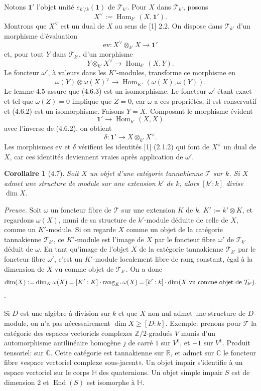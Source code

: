 \documentclass[10pt]{article}
\newcommand{\End}{\operatorname{End}}
\newcommand{\Hom}{\operatorname{Hom}}
\newcommand{\rang}{\operatorname{rang}}
\newcommand{\T}{\mathcal T}
\newcommand{\one}{\mathbf{1}}
\theoremstyle{deligne}
\newtheorem*{corollary*}{Corollaire}
\newenvironment{proofdel}{\textit{Preuve.}}{\hfill$\square$}
\newcommand{\heading}[1]{\vspace{0.7em}\noindent{\bfseries #1}\quad}
\begin{document}
\heading{4.6. Fin de la preuve si \(k'=k(a^{1/p})\).}
Notons \(\one'\) l'objet unité \(e_{k'/k}(\one)\) de \(\T_{k'}\). Pour \(X\) dans \(\T_{k'}\), posons
\[
X^\vee:=\Hom_{k'}(X,\one').
\]
Montrons que \(X^\vee\) est un dual de \(X\) au sens de [1] 2.2. On dispose dans \(\T_{k'}\) d'un morphisme d'évaluation
\[
\tag{4.6.1}
\mathrm{ev}:X^\vee\otimes_{k'}X\longrightarrow \one'
\]
et, pour tout \(Y\) dans \(\T_{k'}\), d'un morphisme
\[
\tag{4.6.2}
Y\otimes_{k'}X^\vee\longrightarrow \Hom_{k'}(X,Y).
\]
Le foncteur \(\omega'\), à valeurs dans les \(K'\)-modules, transforme ce morphisme en
\[
\tag{4.6.3}
\omega(Y)\otimes \omega(X)^\vee\longrightarrow
\Hom_{K'}(\omega(X),\omega(Y)).
\]
Le lemme 4.5 assure que (4.6.3) est un isomorphisme. Le foncteur \(\omega'\) étant exact et tel que \(\omega(Z)=0\) implique que \(Z=0\), car \(\omega\) a ces propriétés, il est conservatif et (4.6.2) est un isomorphisme. Faisons \(Y=X\). Composant le morphisme évident
\[
\one'\longrightarrow \Hom_{k'}(X,X)
\]
avec l'inverse de (4.6.2), on obtient
\[
\delta:\one'\longrightarrow X\otimes_{k'}X^\vee.
\]
Les morphismes \(\mathrm{ev}\) et \(\delta\) vérifient les identités [1] (2.1.2) qui font de \(X^\vee\) un dual de \(X\), car ces identités deviennent vraies après application de \(\omega'\).

\begin{corollary*}[4.7]
Soit \(X\) un objet d'une catégorie tannakienne \(\T\) sur \(k\). Si \(X\) admet une structure de module sur une extension \(k'\) de \(k\), alors \([k':k]\) divise \(\dim X\).
\end{corollary*}

\begin{proofdel}
Soit \(\omega\) un foncteur fibre de \(\T\) sur une extension \(K\) de \(k\), \(K':=k'\otimes K\), et regardons \(\omega(X)\), muni de sa structure de \(k'\)-module déduite de celle de \(X\), comme un \(K'\)-module. Si on regarde \(X\) comme un objet de la catégorie tannakienne \(\T_{k'}\), ce \(K'\)-module est l'image de \(X\) par le foncteur fibre \(\omega'\) de \(\T_{k'}\) déduit de \(\omega\). En tant qu'image de l'objet \(X\) de la catégorie tannakienne \(\T_{k'}\) par le foncteur fibre \(\omega'\), c'est un \(K'\)-module localement libre de rang constant, égal à la dimension de \(X\) vu comme objet de \(\T_{k'}\). On a donc
\[
\dim(X):=\dim_K\omega(X)=[K':K]\cdot \rang_{K'}\omega(X)
=[k':k]\cdot \dim(X\hbox{ vu comme objet de }\T_{k'}).
\]
\end{proofdel}

\heading{4.8. Mise en garde.}
Si \(D\) est une algèbre à division sur \(k\) et que \(X\) non nul admet une structure de \(D\)-module, on n'a pas nécessairement \(\dim X\ge [D:k]\). Exemple: prenons pour \(\T\) la catégorie des espaces vectoriels complexes \(\mathbb Z/2\)-gradués \(V\) munis d'un automorphisme antilinéaire homogène \(j\) de carré \(1\) sur \(V^0\), et \(-1\) sur \(V^1\). Produit tensoriel: sur \(\mathbb C\). Cette catégorie est tannakienne sur \(\mathbb R\), et admet sur \(\mathbb C\) le foncteur fibre «espace vectoriel complexe sous-jacent». Un objet impair s'identifie à un espace vectoriel sur le corps \(\mathbb H\) des quaternions. Un objet simple impair \(S\) est de dimension \(2\) et \(\End(S)\) est isomorphe à \(\mathbb H\).
\end{document}
